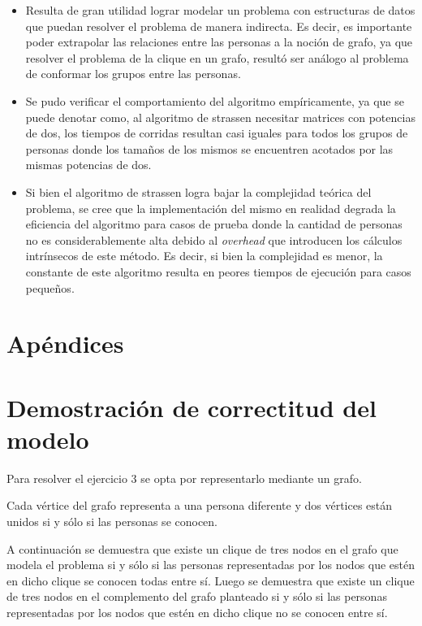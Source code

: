\documentclass[a4paper, 12pt]{article}
\begin{document}
\begin{itemize}
\item Resulta de gran utilidad lograr modelar un problema con estructuras de datos que puedan resolver el problema de manera indirecta. Es decir, es importante poder extrapolar las relaciones entre las personas a la noci\'on de grafo, ya que resolver el problema de la clique en un grafo, result\'o ser an\'alogo al problema de conformar los grupos entre las personas.
\item Se pudo verificar el comportamiento del algoritmo emp\'iricamente, ya que se puede denotar como, al algoritmo de strassen necesitar matrices con potencias de dos, los tiempos de corridas resultan casi iguales para todos los grupos de personas donde los tama\~{n}os de los mismos se encuentren acotados por las mismas potencias de dos.
\item Si bien el algoritmo de strassen logra bajar la complejidad te\'orica del problema, se cree que la implementaci\'on del mismo en realidad degrada la eficiencia del algoritmo para casos de prueba donde la cantidad de personas no es considerablemente alta debido al \emph{overhead} que introducen los c\'alculos intr\'insecos de este m\'etodo. Es decir, si bien la complejidad es menor, la constante de este algoritmo resulta en peores tiempos de ejecuci\'on para casos peque\~{n}os.
\end{itemize}


\section*{Apéndices}
\section{Demostración de correctitud del modelo}\label{dem_clique}

Para resolver el ejercicio 3 se opta por representarlo mediante un grafo.

Cada vértice del grafo representa a una persona diferente y dos vértices están unidos si y sólo si las personas se conocen.


A continuación se demuestra que existe un clique de tres nodos en el grafo que modela el problema si y sólo si las personas representadas por los nodos que estén en dicho clique se conocen todas entre sí. Luego se demuestra que existe un clique de tres nodos en el complemento del grafo planteado si y sólo si las personas representadas por los nodos que estén en dicho clique no se conocen entre sí.
\end{document}
